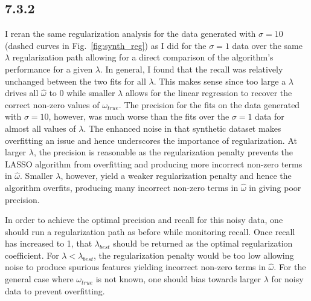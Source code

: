 \documentclass[12pt]{amsart}
\begin{document}
\subsection*{7.3.2}

I reran the same regularization analysis for the data generated with $\sigma = 10$ (dashed curves in Fig.~\ref{fig:synth_reg}) as I did for the $\sigma = 1$ data over the same $\lambda$ regularization path allowing for a direct comparison of the algorithm's performance for a given $\lambda$.  In general, I found that the recall was relatively unchanged between the two fits for all $\lambda$.  This makes sense since too large a $\lambda$ drives all $\hat{\omega}$ to 0 while smaller $\lambda$ allows for the linear regression to recover the correct non-zero values of $\omega_{true}$.  The precision for the fits on the data generated with $\sigma = 10$, however, was much worse than the fits over the $\sigma = 1$ data for almost all values of $\lambda$.  The enhanced noise in that synthetic dataset makes overfitting an issue and hence underscores the importance of regularization.  At larger $\lambda$, the precision is reasonable as the regularization penalty prevents the LASSO algorithm from overfitting and producing more incorrect non-zero terms in $\hat{\omega}$.  Smaller $\lambda$, however, yield a weaker regularization penalty and hence the algorithm overfits, producing many incorrect non-zero terms in $\hat{\omega}$ in giving poor precision.  

In order to achieve the optimal precision and recall for this noisy data, one should run a regularization path as before while monitoring recall.  Once recall has increased to 1, that $\lambda_{best}$ should be returned as the optimal regularization coefficient.  For $\lambda < \lambda_{best}$, the regularization penalty would be too low allowing noise to produce spurious features yielding incorrect non-zero terms in $\hat{\omega}$.  For the general case where $\omega_{true}$ is not known, one should bias towards larger $\lambda$ for noisy data to prevent overfitting.
\end{document}
